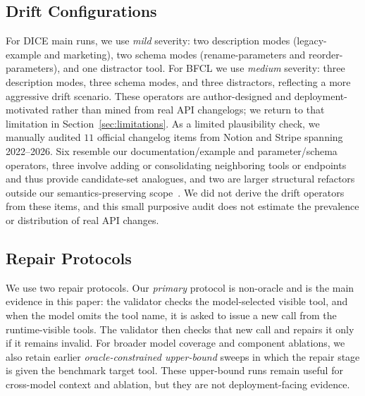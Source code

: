 \documentclass{llncs}
\begin{document}
\subsection{Drift Configurations}
For DICE main runs, we use \emph{mild} severity: two description modes
(legacy-example and marketing), two schema modes
(rename-parameters and reorder-parameters), and one distractor
tool. For BFCL we use \emph{medium} severity: three description modes, three schema
modes, and three distractors, reflecting a more aggressive drift scenario. These
operators are author-designed and deployment-motivated rather than mined from real
API changelogs; we return to that limitation in Section~\ref{sec:limitations}.
As a limited plausibility check, we manually audited $11$ official changelog items
from Notion and Stripe spanning 2022--2026. Six resemble our documentation/example
and parameter/schema operators, three involve adding or consolidating neighboring
tools or endpoints and thus provide candidate-set analogues, and two are larger
structural refactors outside our semantics-preserving
scope~\cite{notionchangelog2026,stripechangelog2026}. We
did not derive the drift operators from these items, and this small purposive audit
does not estimate the prevalence or distribution of real API changes.

\subsection{Repair Protocols}
We use two repair protocols. Our \emph{primary} protocol is non-oracle and is the
main evidence in this paper: the validator checks the model-selected visible tool,
and when the model omits the tool name, it is asked to issue a new call from the
runtime-visible tools. The validator then checks that new call and repairs it only
if it remains invalid. For broader model coverage and component ablations, we also
retain earlier \emph{oracle-constrained upper-bound} sweeps in which the repair
stage is given the benchmark target tool. These upper-bound runs remain useful for
cross-model context and ablation, but they are not deployment-facing evidence.
\end{document}
